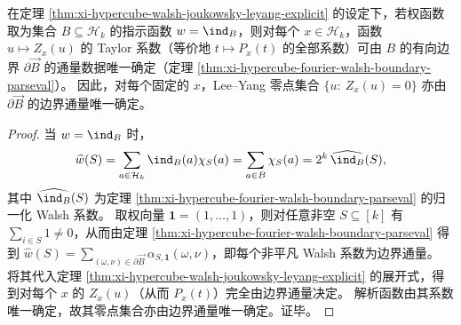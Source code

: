 \begin{corollary}\label{cor:xi-hypercube-leyang-stokes-holography}
在定理 \ref{thm:xi-hypercube-walsh-joukowsky-leyang-explicit} 的设定下，若权函数取为集合 \(B\subseteq\mathcal H_k\) 的指示函数 \(w=\ind_B\)，则对每个 \(x\in\mathcal H_k\)，函数 \(u\mapsto Z_x(u)\) 的 Taylor 系数（等价地 \(t\mapsto P_x(t)\) 的全部系数）可由 \(B\) 的有向边界 \(\partial\overrightarrow{B}\) 的通量数据唯一确定（定理 \ref{thm:xi-hypercube-fourier-walsh-boundary-parseval}）。
因此，对每个固定的 \(x\)，Lee--Yang 零点集合 \(\{u:\ Z_x(u)=0\}\) 亦由 \(\partial\overrightarrow{B}\) 的边界通量唯一确定。
\end{corollary}
\begin{proof}
当 \(w=\ind_B\) 时，
\[
\widehat w(S)=\sum_{a\in\mathcal H_k}\ind_B(a)\chi_S(a)=\sum_{a\in B}\chi_S(a)
=2^k\,\widehat{\ind_B}(S),
\]
其中 \(\widehat{\ind_B}(S)\) 为定理 \ref{thm:xi-hypercube-fourier-walsh-boundary-parseval} 的归一化 Walsh 系数。
取权向量 \(\mathbf 1=(1,\dots,1)\)，则对任意非空 \(S\subseteq[k]\) 有 \(\sum_{i\in S}1\neq 0\)，从而由定理 \ref{thm:xi-hypercube-fourier-walsh-boundary-parseval} 得到
\(
\widehat w(S)=\sum_{(\omega,\nu)\in\partial\overrightarrow{B}}\alpha_{S,\mathbf 1}(\omega,\nu)
\)，即每个非平凡 Walsh 系数为边界通量。
将其代入定理 \ref{thm:xi-hypercube-walsh-joukowsky-leyang-explicit} 的展开式，得到对每个 \(x\) 的 \(Z_x(u)\)（从而 \(P_x(t)\)）完全由边界通量决定。
解析函数由其系数唯一确定，故其零点集合亦由边界通量唯一确定。证毕。
\end{proof}


